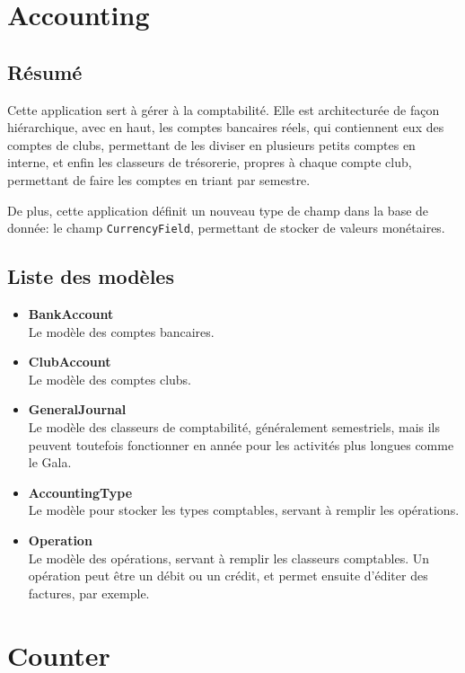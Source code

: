 \documentclass[a4paper]{report}
\begin{document}
\section{Accounting}
\label{sec:accounting}
\subsection{Résumé}
\label{sub:r_sum_}
\par Cette application sert à gérer à la comptabilité. Elle est architecturée de façon hiérarchique, avec en haut, les
comptes bancaires réels, qui contiennent eux des comptes de clubs, permettant de les diviser en plusieurs petits comptes
en interne, et enfin les classeurs de trésorerie, propres à chaque compte club, permettant de faire les comptes en
triant par semestre.
\par De plus, cette application définit un nouveau type de champ dans la base de donnée: le champ \verb#CurrencyField#,
permettant de stocker de valeurs monétaires.

\subsection{Liste des modèles}
\label{sub:liste_des_mod_les}
\begin{itemize}
    \item \textbf{BankAccount} \\
        Le modèle des comptes bancaires.
    \item \textbf{ClubAccount} \\
        Le modèle des comptes clubs.
    \item \textbf{GeneralJournal} \\
        Le modèle des classeurs de comptabilité, généralement semestriels, mais ils peuvent toutefois fonctionner en
        année pour les activités plus longues comme le Gala.
    \item \textbf{AccountingType} \\
        Le modèle pour stocker les types comptables, servant à remplir les opérations.
    \item \textbf{Operation} \\
        Le modèle des opérations, servant à remplir les classeurs comptables. Un opération peut être un débit ou un
        crédit, et permet ensuite d'éditer des factures, par exemple.
\end{itemize}

\section{Counter}
\label{sec:counter}
\end{document}
